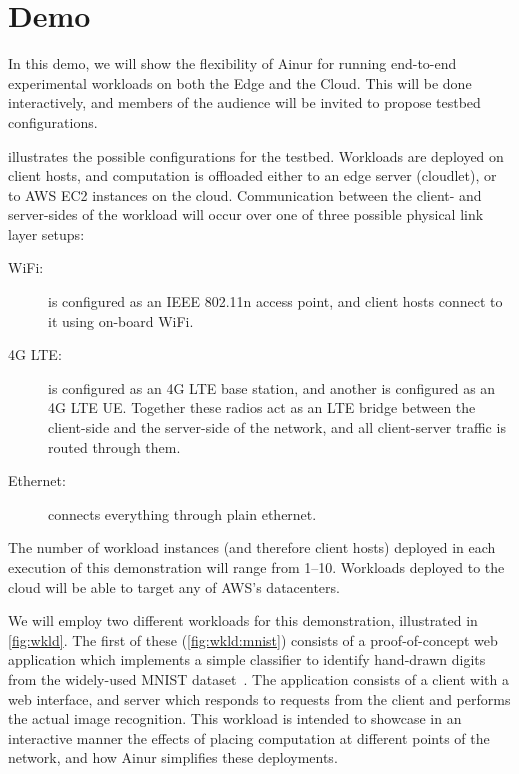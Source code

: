 \section{Demo}\label{sec:demo}

In this demo, we will show the flexibility of Ainur for running end-to-end experimental workloads on both the Edge and the Cloud.
This will be done interactively, and members of the audience will be invited to propose testbed configurations.

 illustrates the possible configurations for the testbed.
Workloads are deployed on client hosts, and computation is offloaded either to an edge server (cloudlet), or to \gls{AWS} \gls{EC2} instances on the cloud.
Communication between the client- and server-sides of the workload will occur over one of three possible physical link layer setups:
\begin{description}
    \item[WiFi:]  is configured as an IEEE 802.11n access point, and client hosts connect to it using on-board WiFi.
    \item[4G \gls{LTE}:]  is configured as an 4G \gls{LTE} base station, and another is configured as an 4G \gls{LTE} \gls{UE}.
    Together these radios act as an \gls{LTE} bridge between the client-side and the server-side of the network, and all client-server traffic is routed through them.
    \item[Ethernet:] connects everything through plain ethernet.
\end{description}

The number of workload instances (and therefore client hosts) deployed in each execution of this demonstration will range from \numrange[]{1}{10}.
Workloads deployed to the cloud will be able to target any of \gls{AWS}'s datacenters.

We will employ two different workloads for this demonstration, illustrated in \cref{fig:wkld}.
The first of these (\cref{fig:wkld:mnist}) consists of a proof-of-concept web application which implements a simple classifier to identify hand-drawn digits from the widely-used \gls{MNIST} dataset~\cite{mnist}.
The application consists of a client with a web interface, and  server which responds to requests from the client and performs the actual image recognition.
This workload is intended to showcase in an interactive manner the effects of placing computation at different points of the network, and how Ainur simplifies these deployments.

